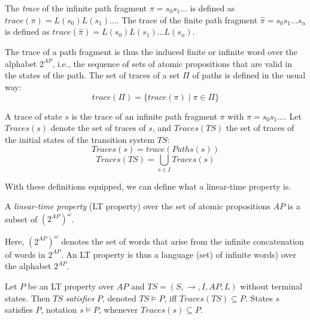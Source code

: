 \documentclass{securem}
\begin{document}
\begin{definition}
    The \textit{trace} of the infinite path fragment $ \pi = s_0 s_1 \dots $ is defined as $ trace(\pi) = L(s_0) L(s_1) \dots $.
    The trace of the finite path fragment $ \widehat{\pi} = s_0 s_1 \dots s_n $ is defined as $ trace(\widehat{\pi}) = L(s_0) L(s_1) \dots L(s_n) $.

    The trace of a path fragment is thus the induced finite or infinite word over the alphabet $ 2^{AP} $, i.e., the sequence of sets of atomic propositions that are valid in the states of the path.
    The set of traces of a set $ \Pi $ of paths is defined in the usual way:
    \begin{equation}
        trace(\Pi) = \{ trace(\pi) \mid \pi \in \Pi \}
    \end{equation}

    A trace of state $ s $ is the trace of an infinite path fragment $ \pi $ with $ \pi = s_0 s_1 \dots $.
    Let $ Traces(s) $ denote the set of traces of $ s $, and $ Traces(TS) $ the set of traces of the initial states of the transition system $ TS $:
    \begin{equation}
        Traces(s) = trace(Paths(s))
    \end{equation}
    \begin{equation}
        Traces(TS) = \bigcup_{s \in I} Traces(s)
    \end{equation}
\end{definition}

With these definitions equipped, we can define what a linear-time property is.

\begin{definition}
    A \textit{linear-time property} (LT property) over the set of atomic propositions $ AP $ is a subset of $ (2^{AP})^\omega $.

    Here, $ (2^{AP})^\omega $ denotes the set of words that arise from the infinite concatenation of words in $ 2^{AP} $.
    An LT property is thus a language (set) of infinite words) over the alphabet $ 2^{AP} $.
\end{definition}

\begin{definition}
    Let $ P $ be an LT property over $ AP $ and $ TS = (S, \rightarrow, I, AP, L) $ without terminal states.
    Then $ TS $ \textit{satisfies} $ P $, denoted $ TS \models P $, iff $ Traces(TS) \subseteq P $.
    States $ s $ satisfies $ P $, notation $ s \models P $, whenever $ Traces(s) \subseteq P $.
\end{definition}
\end{document}
